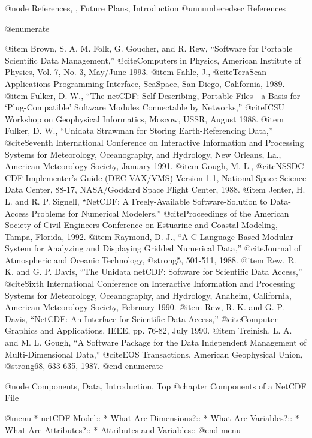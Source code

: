 @node References,  , Future Plans, Introduction
@unnumberedsec References

@enumerate

@item
Brown, S. A, M. Folk, G. Goucher, and R. Rew,
``Software for Portable Scientific Data Management,''
@cite{Computers in Physics},
American Institute of Physics, Vol. 7, No. 3, May/June 1993.
@item
Fahle, J., @cite{TeraScan Applications Programming Interface}, SeaSpace,
San Diego, California, 1989.
@item
Fulker, D. W., ``The netCDF: Self-Describing, Portable Files---a Basis
for `Plug-Compatible' Software Modules Connectable by Networks,''
@cite{ICSU Workshop on Geophysical Informatics}, Moscow, USSR, August
1988.
@item
Fulker, D. W., ``Unidata Strawman for Storing Earth-Referencing Data,''
@cite{Seventh International Conference on Interactive Information
and Processing Systems for Meteorology, Oceanography, and Hydrology}, New
Orleans, La., American Meteorology Society, January 1991.
@item
Gough, M. L., @cite{NSSDC CDF Implementer's Guide (DEC VAX/VMS) Version
1.1}, National Space Science Data Center, 88-17, NASA/Goddard Space
Flight Center, 1988.
@item
Jenter, H. L. and R. P. Signell, ``NetCDF: A Freely-Available
Software-Solution to Data-Access Problems for Numerical Modelers,''
@cite{Proceedings of the American Society of Civil Engineers Conference
on Estuarine and Coastal Modeling}, Tampa, Florida, 1992.
@item
Raymond, D. J., ``A C Language-Based Modular System for Analyzing and
Displaying Gridded Numerical Data,'' @cite{Journal of Atmospheric and Oceanic
Technology}, @strong{5}, 501-511, 1988.
@item
Rew, R. K. and G. P. Davis, ``The Unidata netCDF: Software for
Scientific Data Access,'' @cite{Sixth International Conference on Interactive
Information and Processing Systems for Meteorology, Oceanography, and
Hydrology}, Anaheim, California, American Meteorology Society, February 1990.
@item
Rew, R. K. and G. P. Davis, ``NetCDF: An Interface for
Scientific Data Access,'' @cite{Computer Graphics and Applications},
IEEE, pp. 76-82, July 1990.
@item
Treinish, L. A. and M. L. Gough, ``A Software Package for the Data
Independent Management of Multi-Dimensional Data,'' @cite{EOS
Transactions}, American Geophysical Union, @strong{68}, 633-635, 1987.
@end enumerate

@node Components, Data, Introduction, Top
@chapter Components of a NetCDF File

@menu
* netCDF Model::
* What Are Dimensions?::
* What Are Variables?::
* What Are Attributes?::
* Attributes and Variables::
@end menu

